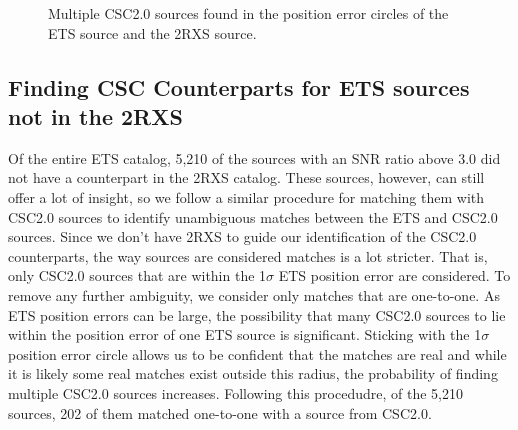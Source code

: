 \begin{figure}[H]
\centering
{}
\caption{Multiple CSC2.0 sources found in the position error circles of the ETS source and the 2RXS source. }
\label{imbeded_fb}
\end{figure}

\subsection{Finding CSC Counterparts for ETS sources not in the 2RXS}

Of the entire ETS catalog, 5,210 of the sources with an SNR ratio above 3.0 did not have a counterpart in the 2RXS catalog. 
These sources, however, can still offer a lot of insight, so we follow a similar procedure for matching them with CSC2.0 sources to identify unambiguous matches between the ETS and CSC2.0 sources. 
Since we don’t have 2RXS to guide our identification of the CSC2.0 counterparts, the way sources are considered matches is a lot stricter. 
That is, only CSC2.0 sources that are within the 1$\sigma$ ETS position error are considered.
To remove any further ambiguity, we consider only matches that are one-to-one.
As ETS position errors can be large, the possibility that many CSC2.0 sources to lie within the position error of one ETS source is significant.
Sticking with the 1$\sigma$ position error circle allows us to be confident that the matches are real and while it is likely some real matches exist outside this radius, the probability of finding multiple CSC2.0 sources increases.
Following this procedudre, of the 5,210 sources, 202 of them matched one-to-one with a source from CSC2.0.




